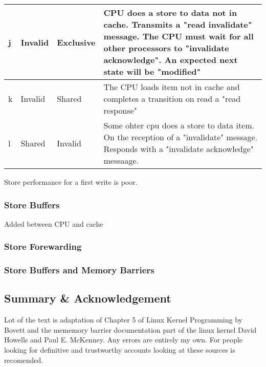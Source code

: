 \documentclass{article}
\begin{document}
\begin{tabular*}{0.75\textwidth} {| l | l | l | p{5cm}| }
    \hline

    j & Invalid & Exclusive &

    CPU does a store to data not in cache. Transmits a "read
    invalidate" message. The CPU must wait for all other processors to
    "invalidate acknowledge". An expected next state will be
    "modified"  
    \\
    \hline

    k & Invalid & Shared &
    
    The CPU loads item not in cache and completes a transition on read
    a "read response"     \\


    \hline
    l & Shared & Invalid &
    
    Some ohter cpu does a store to data item. On the reception of a
    "invalidate" message. Responds with a "invalidate acknowledge"
    messaage. \\

    \hline    
  \end{tabular*}


Store performance for a first write is poor.


\subsubsection{Store Buffers}
Added between CPU and cache
\subsubsection{Store Forewarding}
\subsubsection{Store Buffers and Memory Barriers}


\subsection{Summary \& Acknowledgement}

Lot of the text is adaptation of Chapter 5 of Linux Kernel Programming
by Bovett and the mememory barrier documentation part of the linux
kernel David Howells and Paul E. McKenney. Any errors are entirely my
own. For people looking for definitive and trustworthy accounts
looking at these sources is recomended.
\end{document}
